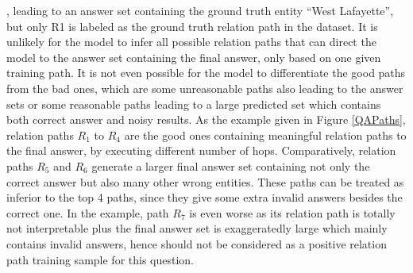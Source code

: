, leading to an answer set containing the ground truth entity ``West Lafayette'', but only R1 is labeled as the ground truth relation path in the dataset. It is unlikely for the model to infer all possible relation paths that can direct the model to the answer set containing the final answer, only based on one given training path. It is not even possible for the model to differentiate the good paths from the bad ones, which are some unreasonable paths also leading to the answer sets %
or some reasonable paths leading to a large predicted set which contains both correct answer and noisy results. As the example given in Figure \ref{QAPaths}, relation paths $R_1$ to $R_4$ are the good ones containing meaningful relation paths to the final answer, by executing different number of hops. Comparatively, relation paths $R_5$ and $R_6$ generate a larger final answer set containing not only the correct answer but also many other wrong entities. These paths can be treated as inferior to the top 4 paths, since they give some extra invalid answers besides the correct one. In the example, path $R_7$ is even worse as its relation path is totally not interpretable plus the final answer set is exaggeratedly large which mainly contains invalid answers, hence should not be considered as a positive relation path training sample for this question. 


